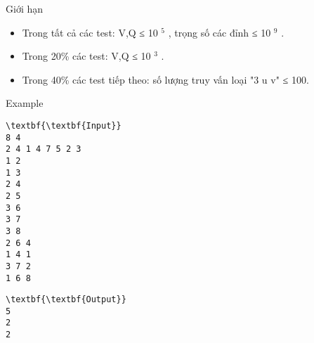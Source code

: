Giới hạn
\begin{itemize}
	\item Trong tất cả các test: V,Q ≤ 10 $^ 5 $ , trọng số các đỉnh ≤ 10 $^ 9 $ .
	\item Trong 20\% các test: V,Q ≤ 10 $^ 3 $ .
	\item Trong 40\% các test tiếp theo: số lượng truy vấn loại "3 u v" ≤ 100.
\end{itemize}
Example
\begin{verbatim}
\textbf{\textbf{Input}}
8 4
2 4 1 4 7 5 2 3
1 2
1 3
2 4
2 5
3 6
3 7
3 8
2 6 4
1 4 1
3 7 2
1 6 8
\end{verbatim}
\begin{verbatim}
\textbf{\textbf{Output}}
5
2
2\end{verbatim}